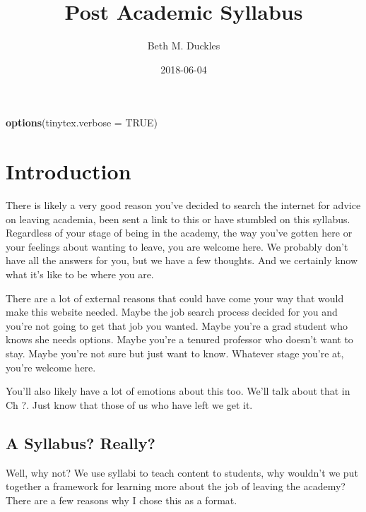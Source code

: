 \documentclass[]{book}
\title{Post Academic Syllabus}
\author{Beth M. Duckles}
\date{2018-06-04}
\newenvironment{Shaded}{\begin{snugshade}}{\end{snugshade}}
\newcommand{\KeywordTok}[1]{\textcolor[rgb]{0.13,0.29,0.53}{\textbf{#1}}}
\newcommand{\DataTypeTok}[1]{\textcolor[rgb]{0.13,0.29,0.53}{#1}}
\newcommand{\OtherTok}[1]{\textcolor[rgb]{0.56,0.35,0.01}{#1}}
\newcommand{\NormalTok}[1]{#1}
\begin{document}
\maketitle

{
\setcounter{tocdepth}{1}
\tableofcontents
}
\begin{Shaded}
\begin{Highlighting}[]
\KeywordTok{options}\NormalTok{(}\DataTypeTok{tinytex.verbose =} \OtherTok{TRUE}\NormalTok{)}
\end{Highlighting}
\end{Shaded}

\chapter{Introduction}\label{intro}

There is likely a very good reason you've decided to search the internet
for advice on leaving academia, been sent a link to this or have
stumbled on this syllabus. Regardless of your stage of being in the
academy, the way you've gotten here or your feelings about wanting to
leave, you are welcome here. We probably don't have all the answers for
you, but we have a few thoughts. And we certainly know what it's like to
be where you are.

There are a lot of external reasons that could have come your way that
would make this website needed. Maybe the job search process decided for
you and you're not going to get that job you wanted. Maybe you're a grad
student who knows she needs options. Maybe you're a tenured professor
who doesn't want to stay. Maybe you're not sure but just want to know.
Whatever stage you're at, you're welcome here.

You'll also likely have a lot of emotions about this too. We'll talk
about that in Ch ?. Just know that those of us who have left we get it.

\section{A Syllabus? Really?}\label{a-syllabus-really}

Well, why not? We use syllabi to teach content to students, why wouldn't
we put together a framework for learning more about the job of leaving
the academy? There are a few reasons why I chose this as a format.
\end{document}
